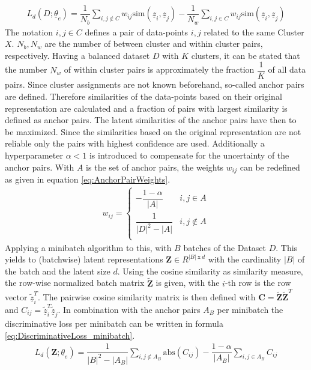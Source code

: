 \documentclass[12pt,DIV14,BCOR12mm,a4paper,footexclude,headinclude,halfparskip-,twoside,openright,cleardoubleempty,idxtotoc,bibtotoc,listtotoc,abstracton]{scrreprt} %
\numberwithin{equation}{chapter}
\begin{document}
\begin{align}
	 L_d(D;\underline{\theta}_e) = \dfrac{1}{N_b}\sum_{i,j \not\in C}w_{ij}\textrm{sim}(\underline{z}_i,\underline{z}_j)-\dfrac{1}{N_w}\sum_{i,j \in C}w_{ij}\textrm{sim}(\underline{z}_i,\underline{z}_j)\label{eq:DiscriminativeLoss_ClusterAssignments}
\end{align}
The notation $i,j \in C$ defines a pair of data-points $i,j$ related to the same Cluster $X$. $N_b,N_w$ are the number of between cluster and within cluster pairs, respectively. Having a balanced dataset $D$ with $K$ clusters, it can be stated that the number $N_w$ of within cluster pairs is approximately the fraction $\dfrac{1}{K}$ of all data pairs. Since cluster assignments are not known beforehand, so-called anchor pairs are defined. Therefore similarities of the data-points based on their original representation are calculated and a fraction of pairs with largest similarity is defined as anchor pairs. The latent similarities of the anchor pairs have then to be maximized. Since the similarities based on the original representation are not reliable only the pairs with highest confidence are used. Additionally a hyperparameter $\alpha < 1$ is introduced to compensate for the uncertainty of the anchor pairs. With $A$ is the set of anchor pairs, the weights $w_{ij}$ can be redefined as given in equation \ref{eq:AnchorPairWeights}.
\begin{align}
	w_{ij} = \begin{cases} -\dfrac{1-\alpha}{|A|} & i,j \in A \\ \dfrac{1}{|D|^2-|A|} & i,j \not\in A\\ \end{cases} \label{eq:AnchorPairWeights}
\end{align}
Applying a minibatch algorithm to this, with $B$ batches of the Dataset $D$. This yields to (batchwise) latent representations $\mathbf{Z} \in R^{|B|\ \textrm{x}\ d}$ with the cardinality $|B|$ of the batch and the latent size $d$. Using the cosine similarity as similarity measure, the row-wise normalized batch matrix $\tilde{\mathbf{Z}}$ is given, with the $i$-th row is the row vector $\tilde{\underline{z}}^{T}_i$. The pairwise cosine similarity matrix is then defined with $\mathbf{C} = \tilde{\mathbf{Z}}\tilde{\mathbf{Z}}^T$ and $C_{ij} = \tilde{\underline{z}}^{T}_i \tilde{\underline{z}}_j$. In combination with the anchor pairs $A_B$ per minibatch the discriminative loss per minibatch can be written in formula \ref{eq:DiscriminativeLoss_minibatch}.
\begin{align}
	 L_d(\mathbf{Z};\underline{\theta}_e) = \dfrac{1}{|B|^2-|A_B|}\sum_{i,j \not\in A_B}\textrm{abs}(C_{ij})-\dfrac{1-\alpha}{|A_B|}\sum_{i,j \in A_B}C_{ij}\label{eq:DiscriminativeLoss_minibatch}
\end{align}
\end{document}
